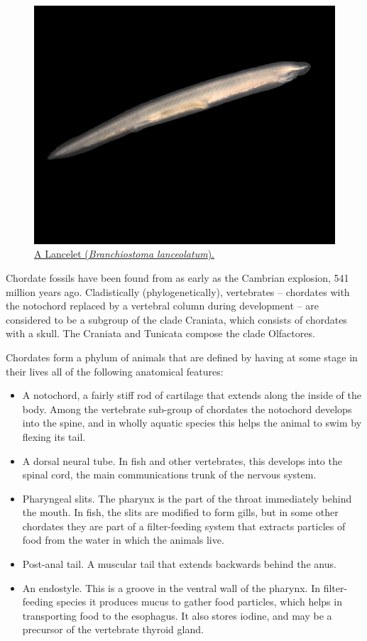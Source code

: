 \begin{figure}

{\centering \includegraphics[width=0.7\linewidth]{./figures/animals/Branchiostoma_lanceolatum} 

}

\caption{\href{https://commons.wikimedia.org/wiki/File:Branchiostoma_lanceolatum.jpg}{A Lancelet (\emph{Branchiostoma lanceolatum}).}}\label{fig:lancelet}
\end{figure}

Chordate fossils have been found from as early as the Cambrian explosion, 541 million years ago. Cladistically (phylogenetically), vertebrates -- chordates with the notochord replaced by a vertebral column during development -- are considered to be a subgroup of the clade Craniata, which consists of chordates with a skull. The Craniata and Tunicata compose the clade Olfactores.

Chordates form a phylum of animals that are defined by having at some stage in their lives all of the following anatomical features:

\begin{itemize}
\tightlist
\item
  A notochord, a fairly stiff rod of cartilage that extends along the inside of the body. Among the vertebrate sub-group of chordates the notochord develops into the spine, and in wholly aquatic species this helps the animal to swim by flexing its tail.
\item
  A dorsal neural tube. In fish and other vertebrates, this develops into the spinal cord, the main communications trunk of the nervous system.
\item
  Pharyngeal slits. The pharynx is the part of the throat immediately behind the mouth. In fish, the slits are modified to form gills, but in some other chordates they are part of a filter-feeding system that extracts particles of food from the water in which the animals live.
\item
  Post-anal tail. A muscular tail that extends backwards behind the anus.
\item
  An endostyle. This is a groove in the ventral wall of the pharynx. In filter-feeding species it produces mucus to gather food particles, which helps in transporting food to the esophagus. It also stores iodine, and may be a precursor of the vertebrate thyroid gland.
\end{itemize}

